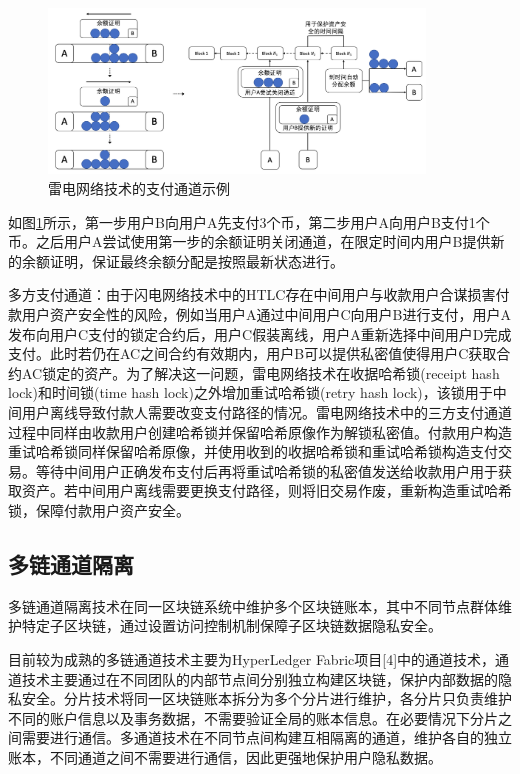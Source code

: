 \begin{figure}
\centering
\includegraphics[width=10cm]{figures/raiden-channel.png}
\caption{雷电网络技术的支付通道示例}
\label{fig:raiden-channel}
\end{figure}

如图\ref{fig:raiden-channel}所示，第一步用户B向用户A先支付3个币，第二步用户A向用户B支付1个币。之后用户A尝试使用第一步的余额证明关闭通道，在限定时间内用户B提供新的余额证明，保证最终余额分配是按照最新状态进行。

多方支付通道：由于闪电网络技术中的HTLC存在中间用户与收款用户合谋损害付款用户资产安全性的风险，例如当用户A通过中间用户C向用户B进行支付，用户A发布向用户C支付的锁定合约后，用户C假装离线，用户A重新选择中间用户D完成支付。此时若仍在AC之间合约有效期内，用户B可以提供私密值使得用户C获取合约AC锁定的资产。为了解决这一问题，雷电网络技术在收据哈希锁(receipt hash lock)和时间锁(time hash lock)之外增加重试哈希锁(retry hash lock)，该锁用于中间用户离线导致付款人需要改变支付路径的情况。雷电网络技术中的三方支付通道过程中同样由收款用户创建哈希锁并保留哈希原像作为解锁私密值。付款用户构造重试哈希锁同样保留哈希原像，并使用收到的收据哈希锁和重试哈希锁构造支付交易。等待中间用户正确发布支付后再将重试哈希锁的私密值发送给收款用户用于获取资产。若中间用户离线需要更换支付路径，则将旧交易作废，重新构造重试哈希锁，保障付款用户资产安全。

\subsection{多链通道隔离}

多链通道隔离技术在同一区块链系统中维护多个区块链账本，其中不同节点群体维护特定子区块链，通过设置访问控制机制保障子区块链数据隐私安全。

目前较为成熟的多链通道技术主要为HyperLedger Fabric项目[4]中的通道技术，通道技术主要通过在不同团队的内部节点间分别独立构建区块链，保护内部数据的隐私安全。分片技术将同一区块链账本拆分为多个分片进行维护，各分片只负责维护不同的账户信息以及事务数据，不需要验证全局的账本信息。在必要情况下分片之间需要进行通信。多通道技术在不同节点间构建互相隔离的通道，维护各自的独立账本，不同通道之间不需要进行通信，因此更强地保护用户隐私数据。

